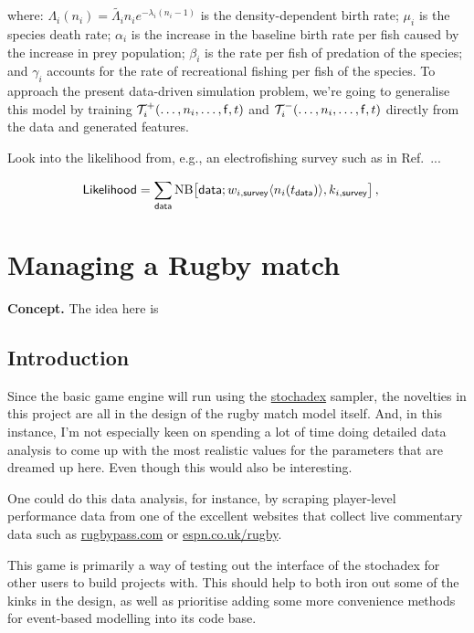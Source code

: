 \documentclass{book}
\begin{document}
where: $\Lambda_{i}(n_{i}) = \tilde{\Lambda_{i}}n_{i}e^{-\lambda_i(n_{i}-1)}$ is the density-dependent birth rate; $\mu_{i}$ is the species death rate; $\alpha_{i}$ is the increase in the baseline birth rate per fish caused by the increase in prey population; $\beta_{i}$ is the rate per fish of predation of the species; and $\gamma_{i}$ accounts for the rate of recreational fishing per fish of the species. To approach the present data-driven simulation problem, we're going to generalise this model by training ${\cal T}^{+}_{i}(\dots, n_i, \dots, {\sf f}, t)$ and ${\cal T}^{-}_{i}(\dots, n_i, \dots, {\sf f}, t)$ directly from the data and generated features.

Look into the likelihood from, e.g., an electrofishing survey such as in Ref.~\cite{envagency2015}...

\begin{align}
{\sf Likelihood} &= \sum_{{\sf data}}{\rm NB}\big[{\sf data};w_{i,{\sf survey}}\langle n_i(t_{{\sf data}})\rangle,k_{i,{\sf survey}}\big] \,,
\end{align}


\chapter{\sffamily Managing a Rugby match}

{\bfseries\sffamily Concept.} The idea here is 

\section{\sffamily Introduction}

Since the basic game engine will run using the \href{https://github.com/umbralcalc/stochadex}{stochadex} sampler, the novelties in this project are all in the design of the rugby match model itself. And, in this instance, I'm not especially keen on spending a lot of time doing detailed data analysis to come up with the most realistic values for the parameters that are dreamed up here. Even though this would also be interesting.

One could do this data analysis, for instance, by scraping player-level performance data from one of the excellent websites that collect live commentary data such as \href{https://www.rugbypass.com/}{rugbypass.com} or \href{https://www.espn.co.uk/rugby/}{espn.co.uk/rugby}.

This game is primarily a way of testing out the interface of the stochadex for other users to build projects with. This should help to both iron out some of the kinks in the design, as well as prioritise adding some more convenience methods for event-based modelling into its code base.
\end{document}
